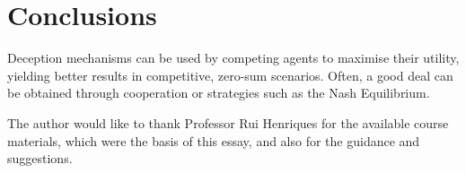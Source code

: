 \section{Conclusions}
Deception mechanisms can be used by competing agents to maximise their utility, yielding better results in competitive, zero-sum scenarios. Often, a good deal can be obtained through cooperation or strategies such as the Nash Equilibrium.  





\begin{acks}
  The author would like to thank Professor Rui Henriques for the available course materials, which were the basis of this essay, and also for the guidance and suggestions.

\end{acks}
